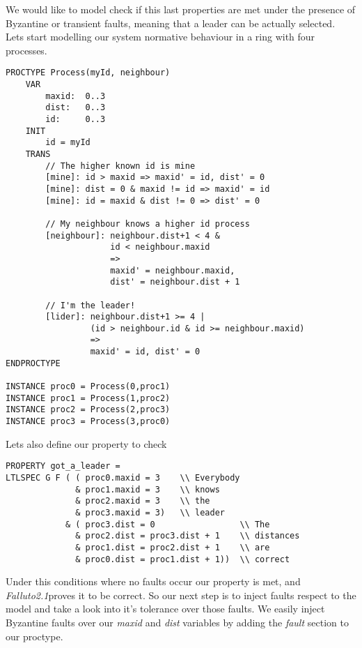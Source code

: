 \documentclass[12pt]{article}
\newcommand{\falluto}{\mbox{\textit{Falluto2.1}}}
\begin{document}
We would like to model check if this last properties are met under the presence of Byzantine or transient faults, meaning that a leader can be actually selected.\\
Lets start modelling our system normative behaviour in a ring with four processes.
\begin{verbatim}
PROCTYPE Process(myId, neighbour)
    VAR
        maxid:  0..3
        dist:   0..3
        id:     0..3
    INIT
        id = myId
    TRANS
        // The higher known id is mine
        [mine]: id > maxid => maxid' = id, dist' = 0
        [mine]: dist = 0 & maxid != id => maxid' = id
        [mine]: id = maxid & dist != 0 => dist' = 0

        // My neighbour knows a higher id process
        [neighbour]: neighbour.dist+1 < 4 &
                     id < neighbour.maxid
                     =>
                     maxid' = neighbour.maxid,
                     dist' = neighbour.dist + 1

        // I'm the leader!
        [lider]: neighbour.dist+1 >= 4 | 
                 (id > neighbour.id & id >= neighbour.maxid)
                 =>
                 maxid' = id, dist' = 0
ENDPROCTYPE

INSTANCE proc0 = Process(0,proc1)
INSTANCE proc1 = Process(1,proc2)
INSTANCE proc2 = Process(2,proc3)
INSTANCE proc3 = Process(3,proc0)
\end{verbatim}
Lets also define our property to check
\begin{verbatim}
PROPERTY got_a_leader =
LTLSPEC G F ( ( proc0.maxid = 3    \\ Everybody
              & proc1.maxid = 3    \\ knows
              & proc2.maxid = 3    \\ the
              & proc3.maxid = 3)   \\ leader
            & ( proc3.dist = 0                 \\ The
              & proc2.dist = proc3.dist + 1    \\ distances
              & proc1.dist = proc2.dist + 1    \\ are
              & proc0.dist = proc1.dist + 1))  \\ correct

\end{verbatim}
Under this conditions where no faults occur our property is met, and \falluto proves it to be correct. So our next step is to inject faults respect to the model and take a look into it's tolerance over those faults. We easily inject Byzantine faults over our \textit{maxid} and \textit{dist} variables by adding the \textit{fault} section to our proctype.
\end{document}
